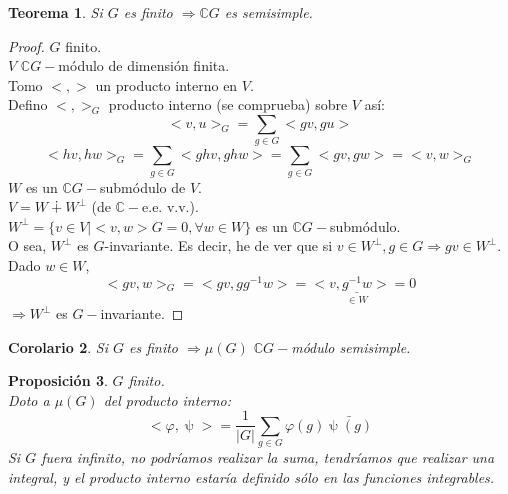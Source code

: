\documentclass[11pt,a4paper]{article}
\theoremstyle{break}
\newtheorem{theorem}{Teorema}[section]
\newtheorem{corollary}[theorem]{Corolario}
\newtheorem{proposition}[theorem]{Proposición}
\begin{document}
\begin{theorem}
Si $G$ es finito $\Rightarrow \mathbb{C}G$ es semisimple.
\end{theorem}

\begin{proof}
$G$ finito. \\
$V$ $\mathbb{C}G-$módulo de dimensión finita. \\
Tomo $<,>$ un producto interno en $V$. \\
Defino $<,>_{G}$ producto interno (se comprueba) sobre $V$ así:
$$<v, u>_{G} = \sum_{g \in G} <gv, gu>$$
$$<hv, hw>_{G} = \sum_{g \in G} <ghv, ghw> = \sum_{g \in G} <gv, gw> = <v, w>_{G}$$
$W$ es un $\mathbb{C}G-$submódulo de $V$. \\
$V = W \dotplus W^{\bot}$ (de $\mathbb{C}-$e.e. v.v.). \\
$W^{\bot} = \{v \in V \mid <v, w>{G} = 0, \forall w \in W\}$ es un $\mathbb{C}G-$submódulo. \\
O sea, $W^{\bot}$ es $G$-invariante. Es decir, he de ver que si $v \in W^{\bot}, g \in G \Rightarrow gv \in W^{\bot}$. \\
Dado $w \in W$,
$$<gv, w>_{G} = <gv, gg^{-1}w> = <v, \underset{\in W}{\underline{g^{-1}w}}> = 0$$
$\Rightarrow W^{\bot}$ es $G-$invariante.
\end{proof}

\begin{corollary}
Si $G$ es finito $\Rightarrow \mu(G)$ $\mathbb{C}G-$módulo semisimple.
\end{corollary}

\begin{proposition}
$G$ finito. \\
Doto a $\mu(G)$ del producto interno:
$$<\varphi, \uppsi> = \frac{1}{|G|} \sum_{g \in G} \varphi(g)\bar{\uppsi(g)}$$
Si $G$ fuera infinito, no podríamos realizar la suma, tendríamos que realizar una integral, y el producto interno estaría definido sólo en las funciones integrables.
\end{proposition}

\end{document}
